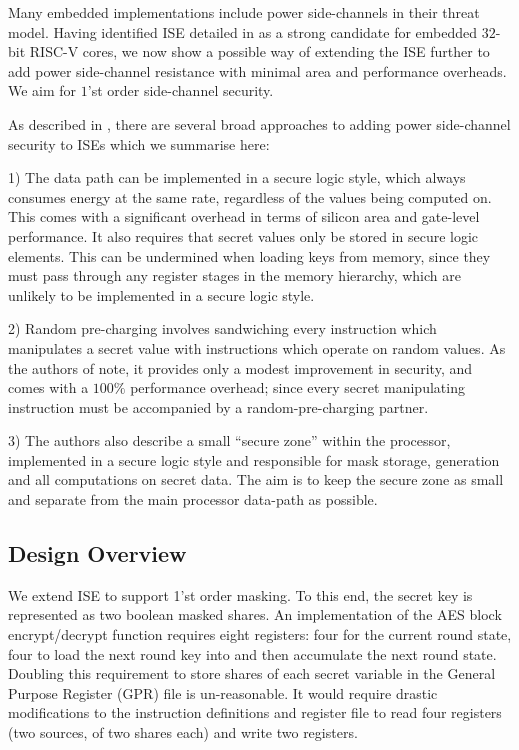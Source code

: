 
Many embedded implementations include power side-channels in their threat
model.
Having identified ISE  detailed in
 as a strong candidate for embedded $32$-bit
RISC-V cores, we now show a possible
way of extending the ISE further to add power side-channel resistance
with minimal area and performance overheads.
We aim for $1$'st order side-channel security.

As described in \cite{TilGro:07}, there are several broad approaches
to adding power side-channel security to ISEs which we summarise here:

1) The data path can be implemented in a secure logic style, which always
consumes energy at the same rate, regardless of the values being computed on.
This comes with a significant overhead in terms of silicon area and
gate-level performance.
It also requires that secret values only be stored in secure logic
elements.
This can be undermined when loading keys from memory, since they must
pass through any register stages in the memory hierarchy, which are
unlikely to be implemented in a secure logic style.

2) Random pre-charging involves sandwiching every instruction which
manipulates a secret value with instructions which operate on random values.
As the authors of \cite{TilGro:07} note, it provides only a modest
improvement in security, and comes with a $100\%$ performance overhead;
since every secret manipulating instruction must be accompanied by
a random-pre-charging partner.

3) The authors also describe a small ``secure zone'' within the processor,
implemented in a secure logic style and responsible for
mask storage, generation and all computations on secret data.
The aim is to keep the secure zone as small and separate from the main
processor data-path as possible.

\subsection{Design Overview}

We extend ISE  to support 1'st order masking.
To this end, the secret key is represented as two boolean masked shares.
An implementation of the AES block encrypt/decrypt function requires
eight registers: four for the current round state, four to load the
next round key into and then accumulate the next round state.
Doubling this requirement to store shares of each secret variable
in the General Purpose Register (GPR) file is un-reasonable.
It would require drastic modifications to the instruction definitions and
register file to read four registers (two sources, of two shares each) and
write two registers.

